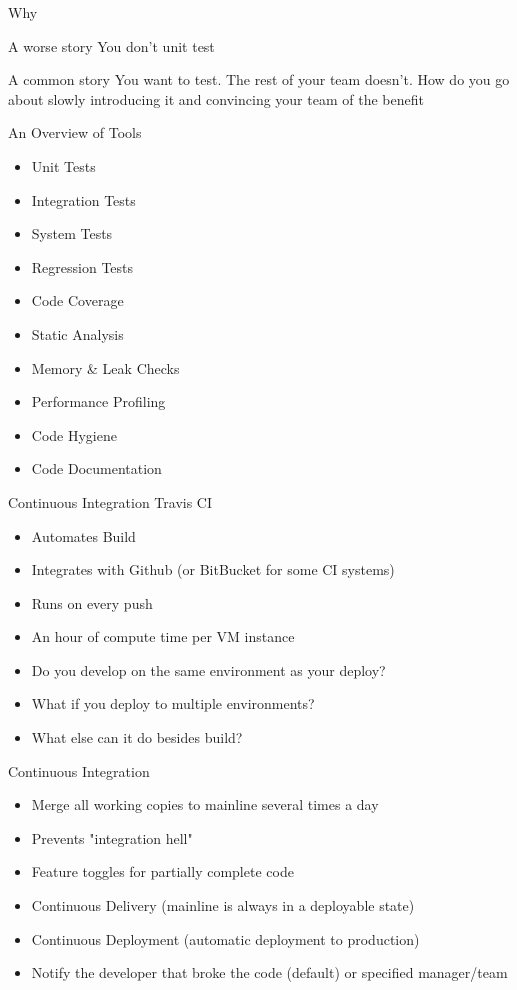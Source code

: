\documentclass{beamer}
\begin{document}
\begin{frame}{Why}
	\begin{block}{A worse story}
		You don't unit test
	\end{block}
	\begin{block}{A common story}
		You want to test. The rest of your team doesn't. How do you go about slowly
		introducing it and convincing your team of the benefit
	\end{block}
\end{frame}

\begin{frame}{An Overview of Tools}
	\begin{itemize}
		\item Unit Tests
		\item Integration Tests
		\item System Tests
		\item Regression Tests
		\item Code Coverage
		\item Static Analysis
		\item Memory \& Leak Checks
		\item Performance Profiling
		\item Code Hygiene
		\item Code Documentation
	\end{itemize}
\end{frame}

\begin{frame}{Continuous Integration}
	Travis CI
	\begin{itemize}
		\item Automates Build
		\item Integrates with Github (or BitBucket for some CI systems)
		\item Runs on every push
		\item An hour of compute time per VM instance
		\item Do you develop on the same environment as your deploy?
		\item What if you deploy to multiple environments?
		\item What else can it do besides build?
	\end{itemize}
\end{frame}

\begin{frame}{Continuous Integration}
	\begin{itemize}
		\item Merge all working copies to mainline several times a day
		\item Prevents "integration hell"
		\item Feature toggles for partially complete code
		\item Continuous Delivery (mainline is always in a deployable state)
		\item Continuous Deployment (automatic deployment to production)
		\item Notify the developer that broke the code (default) or specified manager/team
	\end{itemize}
\end{frame}
\end{document}
